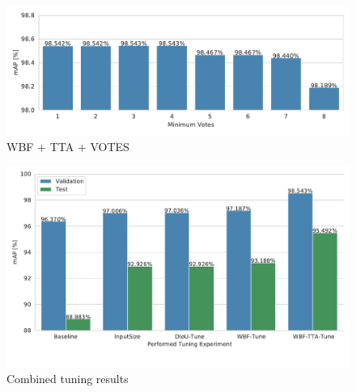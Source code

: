 \begin{figure}
\begin{center}
    \includegraphics[width=\columnwidth]{imgs/yolo_wbf_tta_votes.pdf}
    \caption{WBF + TTA + VOTES}
    \label{fig:wbf_tta_nms_votes}
\end{center}
\end{figure}


\begin{figure}
\begin{center}
    \includegraphics[width=\columnwidth]{imgs/yolo_all_tuning.pdf}
    \caption{Combined tuning results}
    \label{fig:yolo_tuning_combined_results}
\end{center}
\end{figure}









